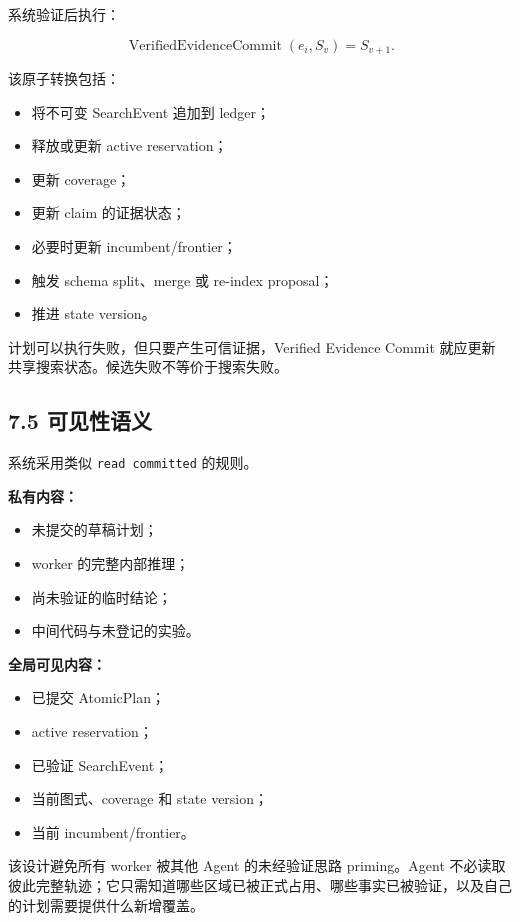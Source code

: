 \documentclass[
  11pt]{ctexart}
\providecommand{\tightlist}{%
  \setlength{\itemsep}{0pt}\setlength{\parskip}{0pt}}
\begin{document}
系统验证后执行：

\[
\operatorname{VerifiedEvidenceCommit}(e_i,S_v)=S_{v+1}.
\]

该原子转换包括：

\begin{itemize}
\tightlist
\item
  将不可变 SearchEvent 追加到 ledger；
\item
  释放或更新 active reservation；
\item
  更新 coverage；
\item
  更新 claim 的证据状态；
\item
  必要时更新 incumbent/frontier；
\item
  触发 schema split、merge 或 re-index proposal；
\item
  推进 state version。
\end{itemize}

计划可以执行失败，但只要产生可信证据，Verified Evidence Commit 就应更新
共享搜索状态。候选失败不等价于搜索失败。

\subsection{7.5 可见性语义}\label{ux53efux89c1ux6027ux8bedux4e49}

系统采用类似 \texttt{read\ committed} 的规则。

\textbf{私有内容：}

\begin{itemize}
\tightlist
\item
  未提交的草稿计划；
\item
  worker 的完整内部推理；
\item
  尚未验证的临时结论；
\item
  中间代码与未登记的实验。
\end{itemize}

\textbf{全局可见内容：}

\begin{itemize}
\tightlist
\item
  已提交 AtomicPlan；
\item
  active reservation；
\item
  已验证 SearchEvent；
\item
  当前图式、coverage 和 state version；
\item
  当前 incumbent/frontier。
\end{itemize}

该设计避免所有 worker 被其他 Agent 的未经验证思路 priming。Agent
不必读取彼此完整轨迹；它只需知道哪些区域已被正式占用、哪些事实已被验证，以及自己的计划需要提供什么新增覆盖。
\end{document}
